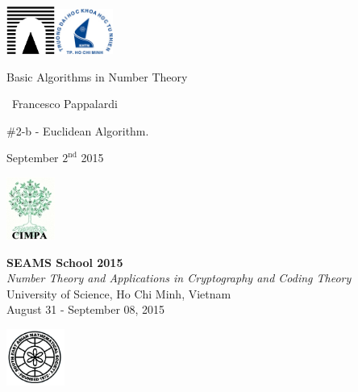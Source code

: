 \documentclass[landscape]{powersem} %
\begin{document}

\begin{slide}
\includegraphics[width=1.6cm]{images/roma3.pdf}\hfill\includegraphics[width=1.9cm]{images/HCMCUS.jpeg}
\vfill

\begin{center}\begin{sc}
\begin{Large}

\textcolor{underlcolor}{Basic Algorithms in Number Theory}
\end{Large}\bigskip

\ {Francesco Pappalardi}\bigskip\bigskip

\begin{large}\begin{bf}\#2-b - Euclidean Algorithm.
\end{bf}\end{large}\medskip

September $2^{\textrm{nd}}$ 2015\medskip
\vfill
\vfil\end{sc}\end{center}
\begin{scriptsize}
 \includegraphics[width=1.6cm]{images/cimpalogo.pdf}\hfill
\begin{minipage}[b]{7cm}
\textbf{SEAMS School 2015}\\
\textit{Number Theory and Applications in Cryptography and Coding Theory}\\
University of Science, Ho Chi Minh, Vietnam\\
August 31 - September 08, 2015
\end{minipage}\hfill
\includegraphics[width=1.9cm]{images/seams.png}
\end{scriptsize}
\end{slide}
\end{document}
